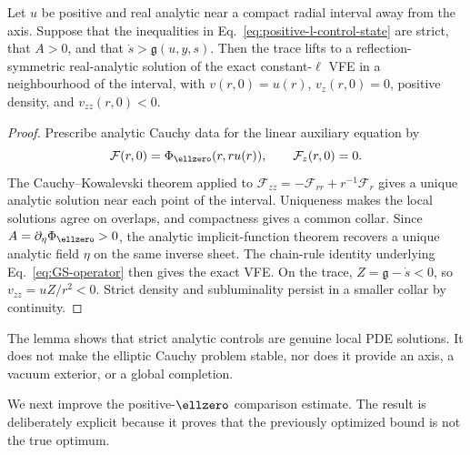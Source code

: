 \begin{lemma}
\label{lem:analytic-lifting-trace-controls}
Let $u$ be positive and real analytic near a compact radial interval away
from the axis. Suppose that the inequalities in
Eq.~\eqref{eq:positive-l-control-state} are strict, that $A>0$, and that
$\dot s>\mathfrak g(u,y,s)$. Then the trace lifts to a reflection-symmetric
real-analytic solution of the exact constant-$\ell$ VFE in a neighbourhood
of the interval, with $v(r,0)=u(r)$, $v_z(r,0)=0$, positive density, and
$v_{zz}(r,0)<0$.
\end{lemma}

\begin{proof}
Prescribe analytic Cauchy data for the linear auxiliary equation by
$$
\mathcal F(r,0)=\Phi_{\ellzero}(r,ru(r)),
\qquad \mathcal F_z(r,0)=0.
$$
The Cauchy--Kowalevski theorem applied to
$\mathcal F_{zz}=-\mathcal F_{rr}+r^{-1}\mathcal F_r$ gives a unique
analytic solution near each point of the interval. Uniqueness makes the
local solutions agree on overlaps, and compactness gives a common collar.
Since $A=\partial_\eta\Phi_{\ellzero}>0$, the analytic implicit-function
theorem recovers a unique analytic field $\eta$ on the same inverse sheet.
The chain-rule identity underlying Eq.~\eqref{eq:GS-operator} then gives
the exact VFE. On the trace,
$Z=\mathfrak g-\dot s<0$, so $v_{zz}=uZ/r^2<0$. Strict density and
subluminality persist in a smaller collar by continuity.
\end{proof}

The lemma shows that strict analytic controls are genuine local PDE
solutions. It does not make the elliptic Cauchy problem stable, nor does it
provide an axis, a vacuum exterior, or a global completion.

We next improve the positive-$\ellzero$ comparison estimate. The result is
deliberately explicit because it proves that the previously optimized
bound is not the true optimum.


